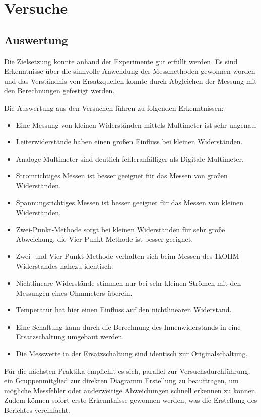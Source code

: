 \part{Versuche}



\chapter{Auswertung}

Die Zielsetzung konnte anhand der Experimente gut erfüllt werden.
Es sind Erkenntnisse über die sinnvolle Anwendung der Messmethoden gewonnen worden und das Verständnis von Ersatzquellen konnte durch Abgleichen der Messung mit den Berechnungen gefestigt werden.

Die Auswertung aus den Versuchen führen zu folgenden Erkenntnissen:
\begin{itemize}
  \item Eine Messung von kleinen Widerständen mittels Multimeter ist sehr ungenau.
  \item Leiterwiderstände haben einen großen Einfluss bei kleinen Widerständen.
  \item Analoge Multimeter sind deutlich fehleranfälliger als Digitale Multimeter.
  \item Stromrichtiges Messen ist besser geeignet für das Messen von großen Widerständen.
  \item Spannungsrichtiges Messen ist besser geeignet für das Messen von kleinen Widerständen.
  \item Zwei-Punkt-Methode sorgt bei kleinen Widerständen für sehr große Abweichung, die Vier-Punkt-Methode ist besser geeignet.
  \item Zwei- und Vier-Punkt-Methode verhalten sich beim Messen des 1kOHM Widerstandes nahezu identisch.
  \item Nichtlineare Widerstände stimmen nur bei sehr kleinen Strömen mit den Messungen eines Ohmmeters überein.
  \item Temperatur hat hier einen Einfluss auf den nichtlinearen Widerstand.
  \item Eine Schaltung kann durch die Berechnung des Innenwiderstands in eine Ersatzschaltung umgebaut werden.
  \item Die Messwerte in der Ersatzschaltung sind identisch zur Originalschaltung.
\end{itemize}
Für die nächsten Praktika empfiehlt es sich, parallel zur Versuchsdurchführung, ein Gruppenmitglied zur direkten Diagramm Erstellung zu beauftragen, um mögliche Messfehler oder anderweitige Abweichungen schnell erkennen zu können.
Zudem können sofort erste Erkenntnisse gewonnen werden, was die Erstellung des Berichtes vereinfacht.
